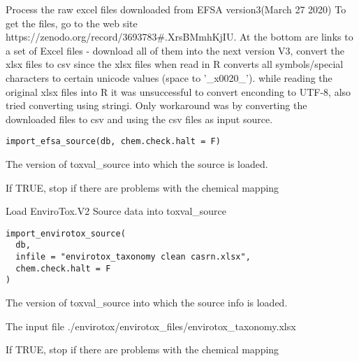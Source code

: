 \documentclass[letterpaper]{book}
\begin{document}
%
\begin{Description}\relax
Process the raw excel files downloaded from EFSA version3(March 27 2020)
To get the files, go to the web site
https://zenodo.org/record/3693783\#.XrsBMmhKjIU. At the bottom are links to
a set of Excel files - download all of them into the next version V3,
convert the xlsx files to csv since the xlsx files when read in R converts all symbols/special characters
to certain unicode values (space to '\_x0020\_'). while reading the original xlsx files into R
it was unsuccessful to convert enconding to UTF-8, also tried converting using stringi. Only workaround was
by converting the downloaded files to csv and using the csv files as input source.
\end{Description}
%
\begin{Usage}
\begin{verbatim}
import_efsa_source(db, chem.check.halt = F)
\end{verbatim}
\end{Usage}
%
\begin{Arguments}
\begin{ldescription}
\item[\code{db}] The version of toxval\_source into which the source is loaded.

\item[\code{chem.check.halt}] If TRUE, stop if there are problems with the chemical mapping
\end{ldescription}
\end{Arguments}
%
\begin{Description}\relax
Load EnviroTox.V2 Source data into toxval\_source
\end{Description}
%
\begin{Usage}
\begin{verbatim}
import_envirotox_source(
  db,
  infile = "envirotox_taxonomy clean casrn.xlsx",
  chem.check.halt = F
)
\end{verbatim}
\end{Usage}
%
\begin{Arguments}
\begin{ldescription}
\item[\code{db}] The version of toxval\_source into which the source info is loaded.

\item[\code{infile}] The input file ./envirotox/envirotox\_files/envirotox\_taxonomy.xlsx

\item[\code{chem.check.halt}] If TRUE, stop if there are problems with the chemical mapping
\end{ldescription}
\end{Arguments}
\end{document}
